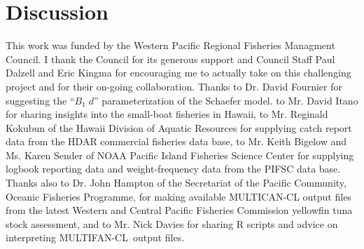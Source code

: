\documentclass[12pt,letterpaper,twoside]{article}
\newcommand\MFCL{MULTIFAN-CL}
\begin{document}
\section{Discussion}


\vspace{4ex}
{}
This work was funded by the Western Pacific Regional Fisheries
Managment Council. I thank the Council for its generous support and
Council Staff Paul Dalzell and Eric Kingma for encouraging me to
actually take on this challenging project and for their on-going
collaboration.
Thanks to Dr. David Fournier for suggesting the ``$B_1\;d$''
parameterization of the Schaefer model.
to Mr. David Itano for sharing insights into the small-boat
fisheries in Hawaii,
to Mr. Reginald Kokubun of the Hawaii Division of Aquatic
Resources for supplying catch report data from the HDAR commercial
fisheries data base,
to Mr. Keith Bigelow and Ms. Karen Sender of NOAA Pacific
Island Fisheries Science Center for supplying logbook reporting data and
weight-frequency data from the PIFSC data base.
Thanks also to Dr. John Hampton of the Secretariat of the Pacific
Community, Oceanic Fisheries Programme, for making available
MULTICAN-CL output files from the latest Western and Central Pacific
Fisheries Commission yellowfin tuna stock assessment, and to Mr. Nick
Davies for sharing R scripts and advice on interpreting \MFCL\ output files.
\end{document}
